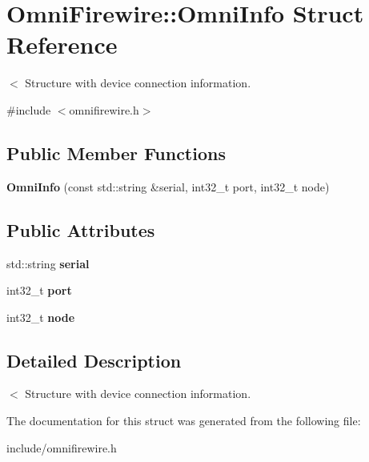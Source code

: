 \hypertarget{structOmniFirewire_1_1OmniInfo}{\section{Omni\-Firewire\-:\-:Omni\-Info Struct Reference}
\label{structOmniFirewire_1_1OmniInfo}
}


$<$ Structure with device connection information.  




{\ttfamily \#include $<$omnifirewire.\-h$>$}

\subsection*{Public Member Functions}
\begin{DoxyCompactItemize}
\item 
\hypertarget{structOmniFirewire_1_1OmniInfo_a947a8907e1a1c6224f25238418faefaf}{{\bfseries Omni\-Info} (const std\-::string \&serial, int32\-\_\-t port, int32\-\_\-t node)}\label{structOmniFirewire_1_1OmniInfo_a947a8907e1a1c6224f25238418faefaf}

\end{DoxyCompactItemize}
\subsection*{Public Attributes}
\begin{DoxyCompactItemize}
\item 
\hypertarget{structOmniFirewire_1_1OmniInfo_a53552f6be728d8ef111252149dce7952}{std\-::string {\bfseries serial}}\label{structOmniFirewire_1_1OmniInfo_a53552f6be728d8ef111252149dce7952}

\item 
\hypertarget{structOmniFirewire_1_1OmniInfo_ac2e80f703a26bf811c7e0da1e723a4d5}{int32\-\_\-t {\bfseries port}}\label{structOmniFirewire_1_1OmniInfo_ac2e80f703a26bf811c7e0da1e723a4d5}

\item 
\hypertarget{structOmniFirewire_1_1OmniInfo_a3203599f79114093c8472fe297a961b1}{int32\-\_\-t {\bfseries node}}\label{structOmniFirewire_1_1OmniInfo_a3203599f79114093c8472fe297a961b1}

\end{DoxyCompactItemize}


\subsection{Detailed Description}
$<$ Structure with device connection information. 

The documentation for this struct was generated from the following file\-:\begin{DoxyCompactItemize}
\item 
include/omnifirewire.\-h\end{DoxyCompactItemize}
